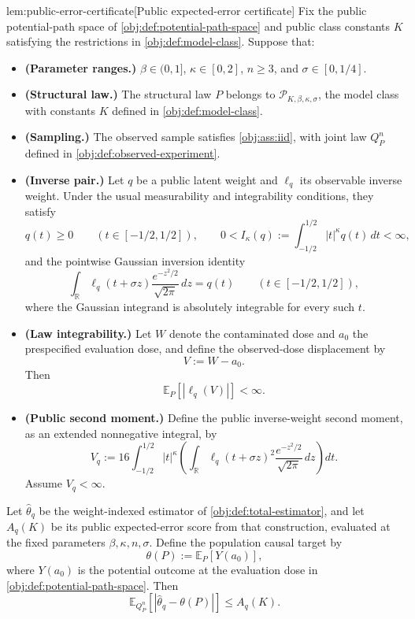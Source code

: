 \begin{lemmav}{lem:public-error-certificate}[Public expected-error certificate]
Fix the public potential-path space of \cref{obj:def:potential-path-space} and public class constants \(K\) satisfying the restrictions in \cref{obj:def:model-class}. Suppose that:
\begin{itemize}
\item \textbf{(Parameter ranges.)} \(\beta\in(0,1]\), \(\kappa\in[0,2]\), \(n\ge3\), and \(\sigma\in[0,1/4]\).
\item \textbf{(Structural law.)} The structural law \(P\) belongs to \(\mathcal P_{K,\beta,\kappa,\sigma}\), the model class with constants \(K\) defined in \cref{obj:def:model-class}.
\item \textbf{(Sampling.)} The observed sample satisfies \cref{obj:ass:iid}, with joint law \(Q_P^n\) defined in \cref{obj:def:observed-experiment}.
\item \textbf{(Inverse pair.)} Let \(q\) be a public latent weight and \(\ell_q\) its observable inverse weight. Under the usual measurability and integrability conditions, they satisfy
\[
q(t)\ge0\qquad(t\in[-1/2,1/2]),
\qquad
0<I_\kappa(q):=\int_{-1/2}^{1/2}|t|^\kappa q(t)\,dt<\infty,
\]
and the pointwise Gaussian inversion identity
\[
\int_{\mathbb R}\ell_q(t+\sigma z)
       \frac{e^{-z^2/2}}{\sqrt{2\pi}}\,dz
=q(t)
\qquad(t\in[-1/2,1/2]),
\]
where the Gaussian integrand is absolutely integrable for every such \(t\).
\item \textbf{(Law integrability.)} Let \(W\) denote the contaminated dose and \(a_0\) the prespecified evaluation dose, and define the observed-dose displacement by
\[
V:=W-a_0.
\]
Then
\[
\mathbb E_P[|\ell_q(V)|]<\infty.
\]
\item \textbf{(Public second moment.)} Define the public inverse-weight second moment, as an extended nonnegative integral, by
\[
V_q:=
16\int_{-1/2}^{1/2}|t|^\kappa
   \left(
   \int_{\mathbb R}\ell_q(t+\sigma z)^2
       \frac{e^{-z^2/2}}{\sqrt{2\pi}}\,dz
   \right)dt.
\]
Assume \(V_q<\infty\).
\end{itemize}
Let \(\widehat\theta_q\) be the weight-indexed estimator of \cref{obj:def:total-estimator}, and let \(A_q(K)\) be its public expected-error score from that construction, evaluated at the fixed parameters \(\beta,\kappa,n,\sigma\). Define the population causal target by
\[
\theta(P):=\mathbb E_P[Y(a_0)],
\]
where \(Y(a_0)\) is the potential outcome at the evaluation dose in \cref{obj:def:potential-path-space}. Then
\[
\mathbb E_{Q_P^n}
 \left[|\widehat\theta_q-\theta(P)|\right]
\le A_q(K).
\]
\end{lemmav}


